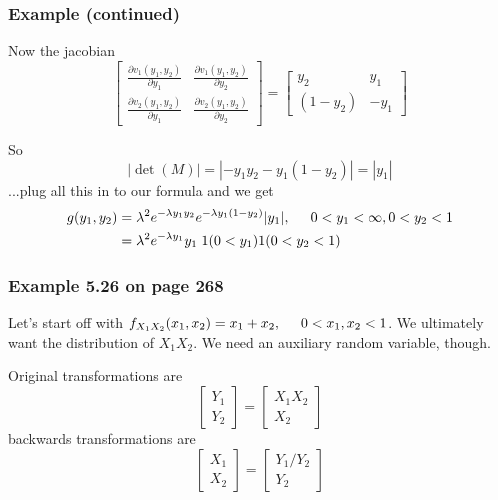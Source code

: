 \documentclass{beamer}
\begin{document}
\begin{frame}
\frametitle{Example (continued)}

Now the jacobian
\[
\left[ \begin{array}{cc}
\frac{\partial v_1(y_1, y_2)}{\partial y_1} & \frac{\partial v_1(y_1, y_2)}{\partial y_2} \\
\frac{\partial v_2(y_1, y_2)}{\partial y_1} & \frac{\partial v_2(y_1, y_2)}{\partial y_2}  \end{array} \right]
=
\left[ \begin{array}{cc}
y_2 & y_1 \\
(1-y_2) & - y_1 \end{array} \right]
\]

So
\[
|\operatorname{det}(M)| = |-y_1y_2 - y_1(1-y_2)| = |y_1|
\]
...plug all this in to our formula and we get
\begin{align*}
g(y_1,y_2) &= \lambda^2 e^{-\lambda y_1 y_2} e^{-\lambda y_1(1-y_2)} |y_1|, \hspace{5mm} 0 < y_1 < \infty, 0 < y_2 < 1\\
&= \lambda^2 e^{-\lambda y_1}y_1 \hspace{1mm} 1(0 < y_1) 1(0 < y_2 < 1)
\end{align*}

\end{frame}

\begin{frame}
\frametitle{Example 5.26 on page 268}

Let's start off with $f_{X_1X_2}(x_1,x_2) = x_1 + x_2, \hspace{5mm} 0 < x_1, x_2 < 1$. We ultimately want the distribution of $X_1X_2$. We need an auxiliary random variable, though. 
\pause
\newline



Original transformations are 
\[
\left[ \begin{array}{c}
Y_1  \\
Y_2 \end{array} \right]
=
\left[ \begin{array}{c}
X_1 X_2  \\
X_2 \end{array} \right]
\] 
backwards transformations are 
\[
\left[ \begin{array}{c}
X_1  \\
X_2 \end{array} \right]
=
\left[ \begin{array}{c}
Y_1/Y_2 \\
Y_2 \end{array} \right]
\] 

\end{frame}
\end{document}
